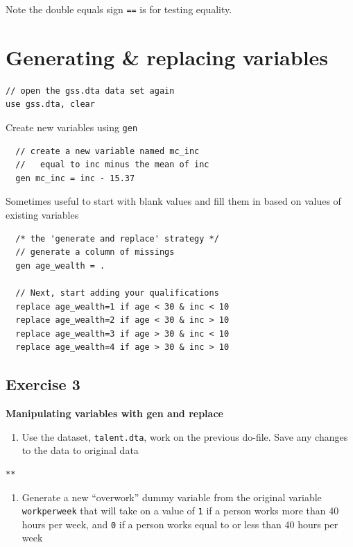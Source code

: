 \documentclass[]{book}
\providecommand{\tightlist}{%
  \setlength{\itemsep}{0pt}\setlength{\parskip}{0pt}}
\begin{document}
Note the double equals sign \texttt{==} is for testing equality.

\hypertarget{generating-replacing-variables}{%
\section{Generating \& replacing variables}\label{generating-replacing-variables}}

\begin{verbatim}
// open the gss.dta data set again 
use gss.dta, clear
\end{verbatim}

Create new variables using \texttt{gen}

\begin{verbatim}
  // create a new variable named mc_inc
  //   equal to inc minus the mean of inc
  gen mc_inc = inc - 15.37  
\end{verbatim}

Sometimes useful to start with blank values and fill them in based on values of existing variables

\begin{verbatim}
  /* the 'generate and replace' strategy */
  // generate a column of missings
  gen age_wealth = .

  // Next, start adding your qualifications
  replace age_wealth=1 if age < 30 & inc < 10
  replace age_wealth=2 if age < 30 & inc > 10
  replace age_wealth=3 if age > 30 & inc < 10
  replace age_wealth=4 if age > 30 & inc > 10
\end{verbatim}

\hypertarget{exercise-3-4}{%
\subsection{Exercise 3}\label{exercise-3-4}}

\textbf{Manipulating variables with gen and replace}

\begin{enumerate}
\def\labelenumi{\arabic{enumi}.}
\tightlist
\item
  Use the dataset, \texttt{talent.dta}, work on the previous do-file. Save any changes to the data to original data
\end{enumerate}

\begin{verbatim}
**
\end{verbatim}

\begin{enumerate}
\def\labelenumi{\arabic{enumi}.}
\setcounter{enumi}{1}
\tightlist
\item
  Generate a new ``overwork'' dummy variable from the original variable \texttt{workperweek} that will take on a value of \texttt{1} if a person works more than 40 hours per week, and \texttt{0} if a person works equal to or less than 40 hours per week
\end{enumerate}
\end{document}
